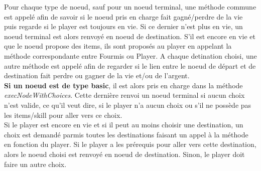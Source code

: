 		Pour chaque type de noeud, sauf pour un noeud terminal, une méthode commune est appelé afin de savoir si le noeud pris en charge fait gagné/perdre de la vie puis regarde si le player est toujours en vie. Si ce dernier n'est plus en vie, un noeud terminal est alors renvoyé en noeud de destination. S'il est encore en vie et que le noeud propose des items, ils sont proposés au player en appelant la méthode correspondante entre Fourmis ou Player. A chaque detination choisi, une autre méthode est appelé afin de regarder si le lien entre le noeud de départ et de destination fait perdre ou gagner de la vie et/ou de l'argent.\\

		\textbf{Si un noeud est de type basic}, il est alors pris en charge dans la méthode \textit{execNodeWithChoices}. Cette dernière renvoi un noeud terminal si aucun choix n'est valide, ce qu'il veut dire, si le player n'a aucun choix ou s'il ne possède pas les items/skill pour aller vers ce choix.\\
		Si le player est encore en vie et si il peut au moins choisir une destination, un choix est demandé parmis toutes les destinations faisant un appel à la méthode en fonction du player. Si le player a les prérequis pour aller vers cette destination, alors le noeud choisi est renvoyé en noeud de destination. Sinon, le player doit faire un autre choix.\\

